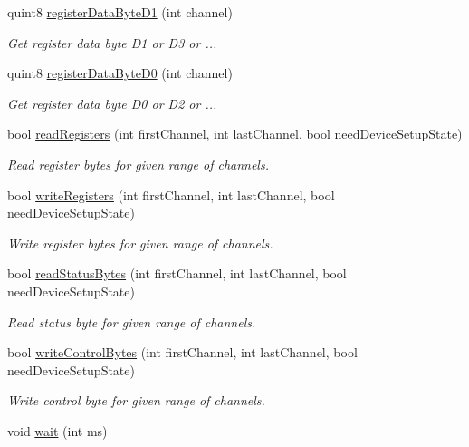 \begin{DoxyCompactItemize}
quint8 \hyperlink{classmdt_device_modbus_wago_module_ae22ec3a2a0adf8407ff3c1eaeed602e6}{registerDataByteD1} (int channel)
\begin{DoxyCompactList}\small\item\em Get register data byte D1 or D3 or ... \end{DoxyCompactList}\item 
quint8 \hyperlink{classmdt_device_modbus_wago_module_add5a97b94ef36520b90501f6325f40cb}{registerDataByteD0} (int channel)
\begin{DoxyCompactList}\small\item\em Get register data byte D0 or D2 or ... \end{DoxyCompactList}\item 
bool \hyperlink{classmdt_device_modbus_wago_module_aa775cffab72f7ed7cd92a48d26da3225}{readRegisters} (int firstChannel, int lastChannel, bool needDeviceSetupState)
\begin{DoxyCompactList}\small\item\em Read register bytes for given range of channels. \end{DoxyCompactList}\item 
bool \hyperlink{classmdt_device_modbus_wago_module_a8fe809c91ccbf05f77c189fbaba12b91}{writeRegisters} (int firstChannel, int lastChannel, bool needDeviceSetupState)
\begin{DoxyCompactList}\small\item\em Write register bytes for given range of channels. \end{DoxyCompactList}\item 
bool \hyperlink{classmdt_device_modbus_wago_module_a90bd4625c8b1efcd34cd56b31dc2f72c}{readStatusBytes} (int firstChannel, int lastChannel, bool needDeviceSetupState)
\begin{DoxyCompactList}\small\item\em Read status byte for given range of channels. \end{DoxyCompactList}\item 
bool \hyperlink{classmdt_device_modbus_wago_module_a92cf3b411849e57c1d392ffa1b2e2ce6}{writeControlBytes} (int firstChannel, int lastChannel, bool needDeviceSetupState)
\begin{DoxyCompactList}\small\item\em Write control byte for given range of channels. \end{DoxyCompactList}\item 
void \hyperlink{classmdt_device_modbus_wago_module_ab74adb7084ef031d51c91d4ce80e08db}{wait} (int ms)

\end{DoxyCompactItemize}
